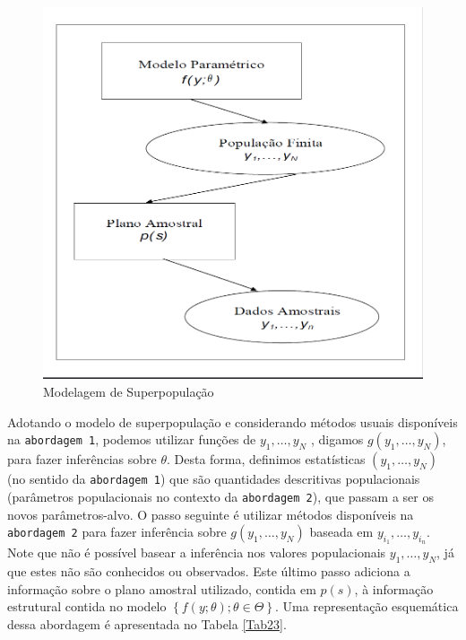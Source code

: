 \documentclass[]{book}
\numberwithin{example}{chapter}
\numberwithin{remark}{chapter}
\numberwithin{definition}{chapter}
\begin{document}
\begin{figure}[htbp]
\centering
\includegraphics{Figuras/fig23.png}
\caption{\label{fig:modsup}Modelagem de Superpopulação}
\end{figure}

Adotando o modelo de superpopulação e considerando métodos usuais
disponíveis na \texttt{abordagem\ 1}, podemos utilizar funções de
\(y_{1},\ldots ,y_{N}\) , digamos \(g( y_{1},\ldots ,y_{N})\), para
fazer inferências sobre \(\theta\). Desta forma, definimos estatísticas
\(\left( y_{1},\ldots ,y_{N}\right)\) (no sentido da
\texttt{abordagem\ 1}) que são quantidades descritivas populacionais
(parâmetros populacionais no contexto da \texttt{abordagem\ 2}), que
passam a ser os novos parâmetros-alvo. O passo seguinte é utilizar
métodos disponíveis na \texttt{abordagem\ 2} para fazer inferência sobre
\(g\left( y_{1},\ldots ,y_{N}\right)\) baseada em
\(y_{i_1},\ldots ,y_{i_n}\). Note que não é possível basear a inferência
nos valores populacionais \(y_{1},\ldots ,y_{N}\), já que estes não são
conhecidos ou observados. Este último passo adiciona a informação sobre
o plano amostral utilizado, contida em \(p(s)\), à informação estrutural
contida no modelo
\(\left\{ f\left( y;\theta \right) ;\theta \in \Theta\right\}\). Uma
representação esquemática dessa abordagem é apresentada no Tabela
\ref{Tab23}.
\end{document}
